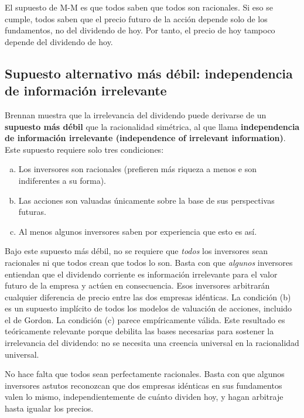 \documentclass[12pt]{article}
\begin{document}
\begin{intuicion}
El supuesto de M-M es que todos saben que todos son racionales. Si eso se cumple, todos saben que el precio futuro de la acci\'on depende solo de los fundamentos, no del dividendo de hoy. Por tanto, el precio de hoy tampoco depende del dividendo de hoy.
\end{intuicion}

\subsection{Supuesto alternativo m\'as d\'ebil: independencia de informaci\'on irrelevante}

Brennan muestra que la irrelevancia del dividendo puede derivarse de un \textbf{supuesto m\'as d\'ebil} que la racionalidad sim\'etrica, al que llama \textbf{independencia de informaci\'on irrelevante (independence of irrelevant information)}. Este supuesto requiere solo tres condiciones:

\begin{enumerate}[(a)]
  \item Los inversores son racionales (prefieren m\'as riqueza a menos e son indiferentes a su forma).
  \item Las acciones son valuadas \'unicamente sobre la base de sus perspectivas futuras.
  \item Al menos algunos inversores saben por experiencia que esto es as\'i.
\end{enumerate}

\begin{explicacion}
Bajo este supuesto m\'as d\'ebil, no se requiere que \textit{todos} los inversores sean racionales ni que todos crean que todos lo son. Basta con que \textit{algunos} inversores entiendan que el dividendo corriente es informaci\'on irrelevante para el valor futuro de la empresa y act\'uen en consecuencia. Esos inversores arbitrar\'an cualquier diferencia de precio entre las dos empresas id\'enticas. La condici\'on (b) es un supuesto impl\'icito de todos los modelos de valuaci\'on de acciones, incluido el de Gordon. La condici\'on (c) parece emp\'iricamente v\'alida. Este resultado es te\'oricamente relevante porque debilita las bases necesarias para sostener la irrelevancia del dividendo: no se necesita una creencia universal en la racionalidad universal.
\end{explicacion}

\begin{intuicion}
No hace falta que todos sean perfectamente racionales. Basta con que algunos inversores astutos reconozcan que dos empresas id\'enticas en sus fundamentos valen lo mismo, independientemente de cu\'anto dividen hoy, y hagan arbitraje hasta igualar los precios.
\end{intuicion}
\end{document}
